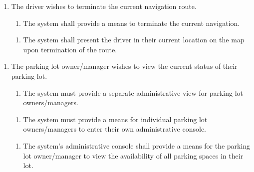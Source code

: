 \documentclass[12pt,letterpaper]{article}
\newcounter{businesseventnum}
\newcounter{funcreqnum}
\begin{document}
\begin{enumerate}[{BE}\thebusinesseventnum.] 
\item The driver wishes to terminate the current navigation route.
\begin{enumerate}[{FR}\thefuncreqnum.] 
    \item The system shall provide a means to terminate the current navigation.
\end{enumerate}
\begin{enumerate}[{FR}\thefuncreqnum.] 
    \item The system shall present the driver in their current location on the
    map upon termination of the route.
\end{enumerate}
\end{enumerate}

\begin{enumerate}[{BE}\thebusinesseventnum.] 
\item The parking lot owner/manager wishes to view the current status of their
parking lot.
\begin{enumerate}[{FR}\thefuncreqnum.] 
    \item The system must provide a separate administrative view for parking lot
    owners/managers.
\end{enumerate}
\begin{enumerate}[{FR}\thefuncreqnum.] 
    \item The system must provide a means for individual parking lot
    owners/managers to enter their own administrative console.
\end{enumerate}
\begin{enumerate}[{FR}\thefuncreqnum.] 
    \item The system's administrative console shall provide a means for the
    parking lot owner/manager to view the availability of all parking spaces in
    their lot.
\end{enumerate}
\end{enumerate}
\end{document}
